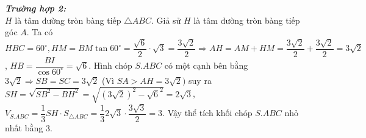 \begin{ex}
{		\textbf{\textit{Trường hợp 2:}}\\
		$H$ là tâm đường tròn bàng tiếp $\triangle A B C$. Giả sử $H$ là tâm đường tròn bàng tiếp góc $A$. Ta có $H B C=60^{\circ}, H M=B M \tan 60^{\circ}=\dfrac{\sqrt{6}}{2}\cdot \sqrt{3}=\dfrac{3 \sqrt{2}}{2}\Rightarrow A H=A M+H M=\dfrac{3 \sqrt{2}}{2}+\dfrac{3 \sqrt{2}}{2}=3 \sqrt{2}$, $H B=\dfrac{B I}{\cos 60^{\circ}}=\sqrt{6}$. Hình chóp $S . A B C$ có một cạnh bên bằng $3 \sqrt{2}\Rightarrow S B=S C=3 \sqrt{2}$ (Vì $S A>A H=3 \sqrt{2})$ suy ra $S H=\sqrt{S B^2-B H^2}=\sqrt{(3 \sqrt{2})^2-\sqrt{6}^2}=2 \sqrt{3}$, $V_{S . A B C}=\dfrac{1}{3}S H \cdot S_{\triangle A B C}=\dfrac{1}{3}2 \sqrt{3}\cdot \dfrac{3 \sqrt{3}}{2}=3$.
		Vậy thể tích khối chóp $S . A B C$ nhỏ nhất bằng $3$.
		
	}
\end{ex}

